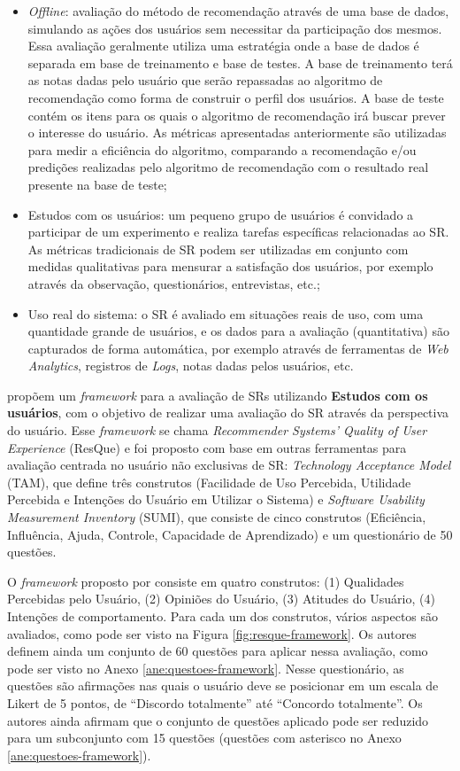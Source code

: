 \begin{itemize}
\item \textit{Offline}: avaliação do método de recomendação através de uma base de dados, simulando as ações
dos usuários sem necessitar da participação dos mesmos. Essa avaliação geralmente utiliza uma estratégia onde a base de dados
é separada em base de treinamento e base de testes. A base de treinamento terá as notas dadas pelo usuário que serão
repassadas ao algoritmo de recomendação como forma de construir o perfil dos usuários. A base de teste contém os itens para os
quais o algoritmo de recomendação irá buscar prever o interesse do usuário. As métricas apresentadas anteriormente são
utilizadas para medir a eficiência do algoritmo, comparando a recomendação e/ou predições realizadas pelo algoritmo de
recomendação com o resultado real presente na base de teste;
\item Estudos com os usuários: um pequeno grupo de usuários é convidado a participar de um experimento e realiza
tarefas específicas relacionadas ao SR. As métricas tradicionais de SR podem ser utilizadas em conjunto com medidas
qualitativas para mensurar a satisfação dos usuários, por exemplo através da observação, questionários, entrevistas, etc.;
\item Uso real do sistema: o SR é avaliado em situações reais de uso, com uma quantidade grande de usuários, e
os dados para a avaliação (quantitativa) são capturados de forma automática, por exemplo através de ferramentas de
\textit{Web Analytics}, registros de \textit{Logs}, notas dadas pelos usuários, etc.
\end{itemize}

 propõem um \textit{framework} para a avaliação de SRs utilizando \textbf{Estudos com os usuários}, com o objetivo
de realizar uma avaliação do SR através da perspectiva do usuário. Esse \textit{framework} se chama \textit{Recommender
Systems' Quality of User Experience}  (ResQue) e foi proposto com base em outras ferramentas para avaliação centrada no
usuário não exclusivas de SR: \textit{Technology Acceptance Model} (TAM), que define três construtos (Facilidade de Uso
Percebida, Utilidade Percebida e Intenções do Usuário em Utilizar o Sistema) e \textit{Software Usability Measurement
Inventory} (SUMI), que consiste de cinco construtos (Eficiência, Influência, Ajuda, Controle, Capacidade de Aprendizado)
e um questionário de 50 questões.

O \textit{framework} proposto por  consiste em quatro construtos: (1) Qualidades Percebidas pelo
Usuário, (2) Opiniões do Usuário, (3) Atitudes do Usuário, (4) Intenções de comportamento.
Para cada um dos construtos, vários aspectos são avaliados, como pode ser visto na Figura \ref{fig:resque-framework}.
Os autores definem ainda um conjunto de 60 questões para aplicar nessa avaliação, como pode ser visto no Anexo
\ref{ane:questoes-framework}. Nesse questionário, as questões são afirmações nas quais o usuário deve se posicionar em
um escala de Likert de 5 pontos, de ``Discordo totalmente'' até ``Concordo totalmente''. Os autores ainda afirmam que o
conjunto de questões aplicado pode ser reduzido para um subconjunto com 15 questões (questões com asterisco no Anexo
\ref{ane:questoes-framework}).

